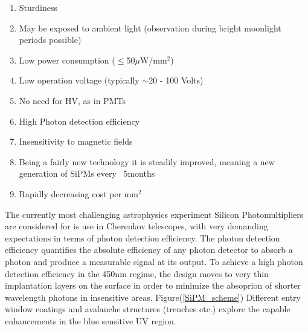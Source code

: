 \documentclass[12pt,article,type=msc,colorback,accentcolor=tud9c]{tudthesis}
\begin{document}
\begin{enumerate}
\item Sturdiness
\item May be exposed to ambient light (observation during bright moonlight periods possible)
\item Low power consumption ($\leq$50$\mu$W/mm$^2$)
\item Low operation voltage (typically $\sim$20 - 100 Volts)
\item No need for HV, as in PMTs
\item High Photon detection efficiency
\item Insensitivity to magnetic fields
\item Being a fairly new technology it is steadily improved, meaning a new generation of SiPMs every ~5months
\item Rapidly decreasing cost per mm$^2$
\end{enumerate}

The currently most challenging astrophysics experiment Silicon Photomultipliers are considered for is use in Cherenkov telescopes, with very demanding expectations in terms of photon detection efficiency. The photon detection efficiency quantifies the absolute efficiency of any photon detector to absorb a photon and produce a measurable signal at its output. To achieve a high photon detection efficiency in the 450nm regime, the design moves to very thin implantation layers on the surface in order to minimize the absoprion of shorter wavelength photons in insensitive areas. Figure(\ref{SiPM_scheme}) Different entry window coatings and avalanche structures (trenches etc.) explore the capable enhancements in the blue sensitive UV region.
\end{document}

